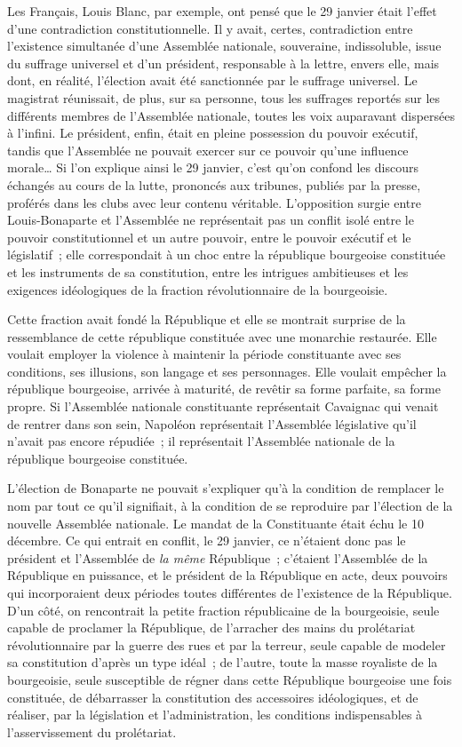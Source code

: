 \documentclass[twoside]{book} %
\begin{document}
Les Français, Louis Blanc, par exemple, ont pensé que le 29 janvier était l’effet d’une contradiction constitutionnelle. Il y avait, certes, contradiction entre l’existence simultanée d’une Assemblée nationale, souveraine, indissoluble, issue du suffrage universel et d’un président, responsable à la lettre, envers elle, mais dont, en réalité, l’élection avait été sanctionnée par le suffrage universel. Le magistrat réunissait, de plus, sur sa personne, tous les suffrages reportés sur les différents membres de l’Assemblée nationale, toutes les voix auparavant dispersées à l’infini. Le président, enfin, était en pleine possession du pouvoir exécutif, tandis que l’Assemblée ne pouvait exercer sur ce pouvoir qu’une influence morale… Si l’on explique ainsi le 29 janvier, c’est qu’on confond les discours échangés au cours de la lutte, prononcés aux tribunes, publiés par la presse, proférés dans les clubs avec leur contenu véritable. L’opposition surgie entre Louis-Bonaparte et l’Assemblée ne représentait pas un conflit isolé entre le pouvoir constitutionnel et un autre pouvoir, entre le pouvoir exécutif et le législatif ; elle correspondait à un choc entre la république bourgeoise constituée et les instruments de sa constitution, entre les intrigues ambitieuses et les exigences idéologiques de la fraction révolutionnaire de la bourgeoisie.\par
Cette fraction avait fondé la République et elle se montrait surprise de la ressemblance de cette république constituée avec une monarchie restaurée. Elle voulait employer la violence à maintenir la période constituante avec ses conditions, ses illusions, son langage et ses personnages. Elle voulait empêcher la république bourgeoise, arrivée à maturité, de revêtir sa forme parfaite, sa forme propre. Si l’Assemblée nationale constituante représentait Cavaignac qui venait de rentrer dans son sein, Napoléon représentait l’Assemblée législative qu’il n’avait pas encore répudiée ; il représentait l’Assemblée nationale de la république bourgeoise constituée.\par
L’élection de Bonaparte ne pouvait s’expliquer qu’à la condition de remplacer le nom par tout ce qu’il signifiait, à la condition de se reproduire par l’élection de la nouvelle Assemblée nationale. Le mandat de la Constituante était échu le 10 décembre. Ce qui entrait en conflit, le 29 janvier, ce n’étaient donc pas le président et l’Assemblée de \emph{la même} République ; c’étaient l’Assemblée de la République en puissance, et le président de la République en acte, deux pouvoirs qui incorporaient deux périodes toutes différentes de l’existence de la République. D’un côté, on rencontrait la petite fraction républicaine de la bourgeoisie, seule capable de proclamer la République, de l’arracher des mains du prolétariat révolutionnaire par la guerre des rues et par la terreur, seule capable de modeler sa constitution d’après un type idéal ; de l’autre, toute la masse royaliste de la bourgeoisie, seule susceptible de régner dans cette République bourgeoise une fois constituée, de débarrasser la constitution des accessoires idéologiques, et de réaliser, par la législation et l’administration, les conditions indispensables à l’asservissement du prolétariat.\par
\end{document}
